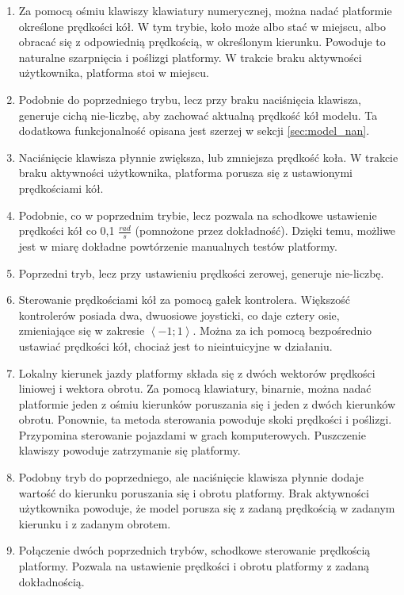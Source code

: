 		\begin{enumerate}
			\item Za pomocą ośmiu klawiszy klawiatury numerycznej, można nadać platformie określone prędkości kół.
			W tym trybie, koło może albo stać w miejscu, albo obracać się z odpowiednią prędkością, w określonym kierunku. 
			Powoduje to naturalne szarpnięcia i poślizgi platformy. W trakcie braku aktywności użytkownika, platforma stoi w miejscu.
			\item Podobnie do poprzedniego trybu, lecz przy braku naciśnięcia klawisza, generuje cichą nie-liczbę, aby zachować aktualną prędkość kół modelu.
			Ta dodatkowa funkcjonalność opisana jest szerzej w sekcji \ref{sec:model_nan}.
			\item Naciśnięcie klawisza płynnie zwiększa, lub zmniejsza prędkość koła. W trakcie braku aktywności użytkownika, platforma porusza się 
			z ustawionymi prędkościami kół.
			\item Podobnie, co w poprzednim trybie, lecz pozwala na schodkowe ustawienie prędkości kół co 0,1 $\frac{rad}{s}$ (pomnożone przez dokładność).
			Dzięki temu, możliwe jest w miarę dokładne powtórzenie manualnych testów platformy.
			\item Poprzedni tryb, lecz przy ustawieniu prędkości zerowej, generuje nie-liczbę.
			\item Sterowanie prędkościami kół za pomocą gałek kontrolera.
			Większość kontrolerów posiada dwa, dwuosiowe joysticki, co daje cztery osie, zmieniające się w zakresie $\left<-1;1\right>$.
			Można za ich pomocą bezpośrednio ustawiać prędkości kół, chociaż jest to nieintuicyjne w działaniu.
			\item Lokalny kierunek jazdy platformy składa się z dwóch wektorów prędkości liniowej i wektora obrotu. 
			Za pomocą klawiatury, binarnie, można nadać platformie jeden z ośmiu kierunków poruszania się i jeden z dwóch kierunków obrotu.
			Ponownie, ta metoda sterowania powoduje skoki prędkości i poślizgi. Przypomina sterowanie pojazdami w grach komputerowych.
			Puszczenie klawiszy powoduje zatrzymanie się platformy.
			\item Podobny tryb do poprzedniego, ale naciśnięcie klawisza płynnie dodaje wartość do kierunku poruszania się i obrotu platformy.
			Brak aktywności użytkownika powoduje, że model porusza się z zadaną prędkością w zadanym kierunku i z zadanym obrotem.
			\item Połączenie dwóch poprzednich trybów, schodkowe sterowanie prędkością platformy. Pozwala na ustawienie prędkości i obrotu platformy z zadaną dokładnością.

\end{enumerate}
